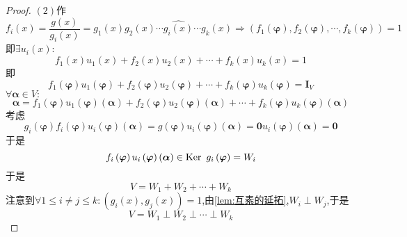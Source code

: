 {\begin{proof}
        $(2)$作\[
            f_i\left(x\right)=\frac{g\left(x\right)}{g_i\left(x\right)}=g_1\left(x\right)g_2\left(x\right)\cdots\widehat{g_i\left(x\right)}\cdots g_k\left(x\right)\Longrightarrow\left(
            f_1\left(\bm{\varphi}\right),f_2\left(\bm{\varphi}\right),\cdots, f_k\left(\bm{\varphi}\right)
            \right)=1
        \]即$\exists u_i\left(x\right):$\[
            f_1\left(x\right)u_1\left(x\right)+f_2\left(x\right)u_2\left(x\right)+\cdots+f_k\left(x\right)u_k\left(x\right)=1
        \]即\[
            f_1\left(\bm{\varphi}\right)u_1\left(\bm{\varphi}\right)+f_2\left(\bm{\varphi}\right)u_2\left(\bm{\varphi}\right)+\cdots+f_k\left(\bm{\varphi}\right)u_k\left(\bm{\varphi}\right)=\bm{I}_V
        \]$\forall\bm{\alpha}\in V:$\[
            \bm{\alpha}=f_1\left(\bm{\varphi}\right)u_1\left(\bm{\varphi}\right)\left(\bm{\alpha}\right)+f_2\left(\bm{\varphi}\right)u_2\left(\bm{\varphi}\right)\left(\bm{\alpha}\right)+\cdots+f_k\left(\bm{\varphi}\right)u_k\left(\bm{\varphi}\right)\left(\bm{\alpha}\right)
        \]考虑\[
            g_i\left(
            \bm{\varphi}
            \right)f_i\left(
            \bm{\varphi}
            \right)u_i\left(
            \bm{\varphi}
            \right)\left(
            \bm{\alpha}
            \right)=g\left(
            \bm{\varphi}
            \right)u_i\left(
            \bm{\varphi}
            \right)\left(
            \bm{\alpha}
            \right)=\bm{0}u_i\left(
            \bm{\varphi}
            \right)\left(\bm{\alpha}\right)=\bm{0}
        \]于是\[
            f_i\left(
            \bm{\varphi}
            \right)u_i\left(
            \bm{\varphi}
            \right)\left(
            \bm{\alpha}
            \right)\in \operatorname{Ker\,} \,g_i\left(
            \bm{\varphi}
            \right)=W_i
        \]于是\[
            V=W_1+W_2+\cdots+W_k
        \]
        注意到$\forall1\leqslant i\neq j\leqslant k:\left(g_i\left(x\right),g_j\left(x\right)\right)=1$,由\cref{lem:互素的延拓},$W_i\perp W_j$,于是\[
            V=W_1\perp W_2\perp\cdots\perp W_k
        \]


\end{proof}}
